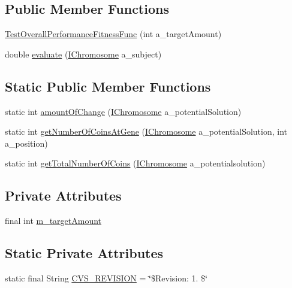 \subsection*{Public Member Functions}
\begin{DoxyCompactItemize}
\item 
\hyperlink{classorg_1_1jgap_1_1perf_1_1_test_overall_performance_fitness_func_a89f673687209ec7a8469cbcec58484e8}{Test\-Overall\-Performance\-Fitness\-Func} (int a\-\_\-target\-Amount)
\item 
double \hyperlink{classorg_1_1jgap_1_1perf_1_1_test_overall_performance_fitness_func_ad03ee237768a581313bb05c1a7fdf481}{evaluate} (\hyperlink{interfaceorg_1_1jgap_1_1_i_chromosome}{I\-Chromosome} a\-\_\-subject)
\end{DoxyCompactItemize}
\subsection*{Static Public Member Functions}
\begin{DoxyCompactItemize}
\item 
static int \hyperlink{classorg_1_1jgap_1_1perf_1_1_test_overall_performance_fitness_func_aa782f54f1a0b433a1a26363ac3e310e4}{amount\-Of\-Change} (\hyperlink{interfaceorg_1_1jgap_1_1_i_chromosome}{I\-Chromosome} a\-\_\-potential\-Solution)
\item 
static int \hyperlink{classorg_1_1jgap_1_1perf_1_1_test_overall_performance_fitness_func_a5a0912da774ae3f4e5d8435477234e5a}{get\-Number\-Of\-Coins\-At\-Gene} (\hyperlink{interfaceorg_1_1jgap_1_1_i_chromosome}{I\-Chromosome} a\-\_\-potential\-Solution, int a\-\_\-position)
\item 
static int \hyperlink{classorg_1_1jgap_1_1perf_1_1_test_overall_performance_fitness_func_a3585593489eaf2447bf523eeb98eec5a}{get\-Total\-Number\-Of\-Coins} (\hyperlink{interfaceorg_1_1jgap_1_1_i_chromosome}{I\-Chromosome} a\-\_\-potentialsolution)
\end{DoxyCompactItemize}
\subsection*{Private Attributes}
\begin{DoxyCompactItemize}
\item 
final int \hyperlink{classorg_1_1jgap_1_1perf_1_1_test_overall_performance_fitness_func_a167b089eeb152efef50d2bdcc94853ee}{m\-\_\-target\-Amount}
\end{DoxyCompactItemize}
\subsection*{Static Private Attributes}
\begin{DoxyCompactItemize}
\item 
static final String \hyperlink{classorg_1_1jgap_1_1perf_1_1_test_overall_performance_fitness_func_a777b1a23fbd36b31a3929f36bae39519}{C\-V\-S\-\_\-\-R\-E\-V\-I\-S\-I\-O\-N} = \char`\"{}\$Revision\-: 1. \$\char`\"{}
\end{DoxyCompactItemize}
